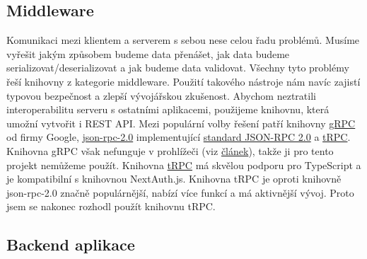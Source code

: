 \subsection{Middleware}\label{subsec:middleware}

Komunikaci mezi klientem a serverem s sebou nese celou řadu problémů.
Musíme vyřešit jakým způsobem budeme data přenášet, jak data budeme serializovat\slash deserializovat a jak budeme data validovat.
Všechny tyto problémy řeší knihovny z kategorie middleware.
Použití takového nástroje nám navíc zajistí typovou bezpečnost a zlepší vývojářskou zkušenost.
Abychom neztratili interoperabilitu serveru s ostatními aplikacemi, použijeme knihovnu, která umožní vytvořit i REST API\@.
Mezi populární volby řešení patří knihovny \href{https://grpc.io/}{gRPC} od firmy Google, \href{https://www.npmjs.com/package/json-rpc-2.0}{json-rpc-2.0} implementující \href{https://www.jsonrpc.org/specification}{standard JSON-RPC 2.0}  a \href{https://trpc.io/}{tRPC}.
Knihovna gRPC však nefunguje v prohlížeči (viz \href{https://grpc.io/blog/state-of-grpc-web/}{článek}), takže ji pro tento projekt nemůžeme použít.
Knihovna \href{https://trpc.io/}{tRPC} má skvělou podporu pro TypeScript a je kompatibilní s knihovnou NextAuth.js.
Knihovna tRPC je oproti knihovně json-rpc-2.0 značně populárnější, nabízí více funkcí a má aktivnější vývoj.
Proto jsem se nakonec rozhodl použít knihovnu tRPC\@.

\subsection{Backend aplikace}\label{subsec:backend-aplikace}

